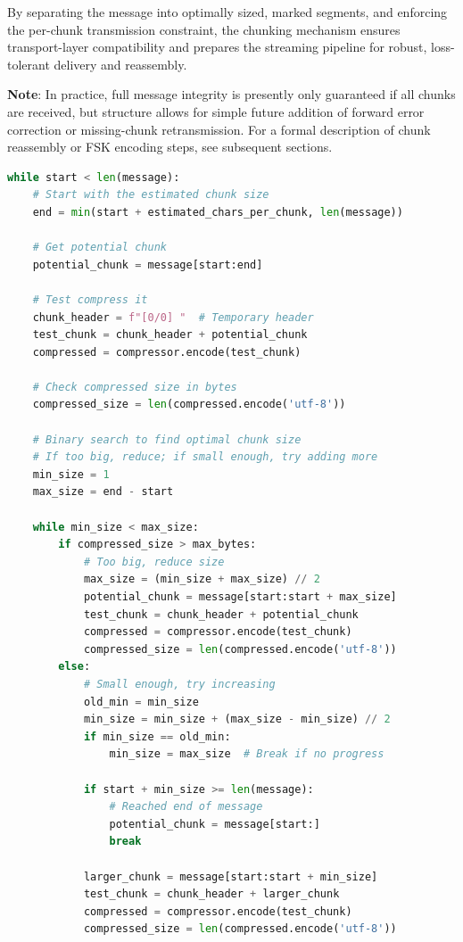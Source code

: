 \documentclass[12pt,openany]{article}
\theoremstyle{definition}
\theoremstyle{definition}
\theoremstyle{definition}
\begin{document}
By separating the message into optimally sized, marked segments, and enforcing the per-chunk transmission constraint, the chunking mechanism ensures transport-layer compatibility and prepares the streaming pipeline for robust, loss-tolerant delivery and reassembly.

\textbf{Note}: In practice, full message integrity is presently only guaranteed if all chunks are received, but structure allows for simple future addition of forward error correction or missing-chunk retransmission. For a formal description of chunk reassembly or FSK encoding steps, see subsequent sections.

\begin{lstlisting}[language=Python, caption=Chunking Algorithm]
while start < len(message):
    # Start with the estimated chunk size
    end = min(start + estimated_chars_per_chunk, len(message))
    
    # Get potential chunk
    potential_chunk = message[start:end]
    
    # Test compress it
    chunk_header = f"[0/0] "  # Temporary header
    test_chunk = chunk_header + potential_chunk
    compressed = compressor.encode(test_chunk)
    
    # Check compressed size in bytes
    compressed_size = len(compressed.encode('utf-8'))
    
    # Binary search to find optimal chunk size
    # If too big, reduce; if small enough, try adding more
    min_size = 1
    max_size = end - start
    
    while min_size < max_size:
        if compressed_size > max_bytes:
            # Too big, reduce size
            max_size = (min_size + max_size) // 2
            potential_chunk = message[start:start + max_size]
            test_chunk = chunk_header + potential_chunk
            compressed = compressor.encode(test_chunk)
            compressed_size = len(compressed.encode('utf-8'))
        else:
            # Small enough, try increasing
            old_min = min_size
            min_size = min_size + (max_size - min_size) // 2
            if min_size == old_min:
                min_size = max_size  # Break if no progress
            
            if start + min_size >= len(message):
                # Reached end of message
                potential_chunk = message[start:]
                break
            
            larger_chunk = message[start:start + min_size]
            test_chunk = chunk_header + larger_chunk
            compressed = compressor.encode(test_chunk)
            compressed_size = len(compressed.encode('utf-8'))
            

\end{lstlisting}
\end{document}
